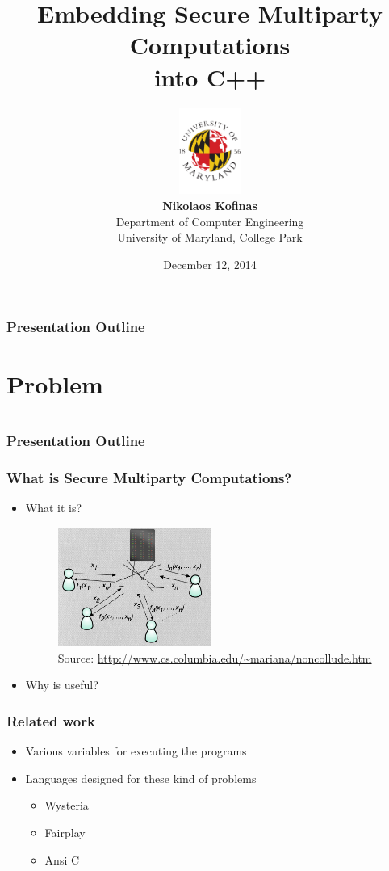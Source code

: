 \documentclass{beamer}
\title[SMC and C++]{Embedding Secure Multiparty Computations\\ into C++
}
\author[Nikolaos Kofinas]{
\includegraphics[width = 2cm]{informal.pdf}\\
\textbf{Nikolaos Kofinas}\\
Department of Computer Engineering\\
University of Maryland, College Park
\vspace*{-0.8cm}
}
\date{December 12, 2014
\vspace*{-1.2cm}
}
\begin{document}
\frame[plain]{\titlepage
}





\section[Outline]{}
\begin{frame}[fragile]
\frametitle{Presentation Outline}
\tableofcontents
\end{frame}

\section{Problem}

\section[Outline]{}
\begin{frame}[fragile]
\frametitle{Presentation Outline}
\tableofcontents[currentsection]
\end{frame}

\begin{frame}
\frametitle{What is Secure Multiparty Computations?}
\begin{itemize}
\item What it is?
\begin{figure}
\includegraphics[width=5cm]{non_collude.png}
\caption{Source:\tiny{ \url{http://www.cs.columbia.edu/~mariana/noncollude.htm}}}
\end{figure}
\item Why is useful?
\end{itemize}
\end{frame}


\begin{frame}
\frametitle{Related work}
\begin{itemize}
\item Various variables for executing the programs
\item Languages designed for these kind of problems
\begin{itemize}
\item Wysteria
\item Fairplay
\item Ansi C
\end{itemize}
\end{itemize}
\end{frame}
\end{document}
